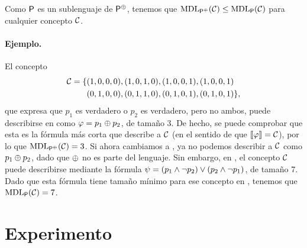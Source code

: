 Como ${\sf P}$ es un sublenguaje de ${\sf P}^\oplus$, tenemos que ${\rm MDL}_{{\sf P}^\oplus}(\mathcal{C})\leq{\rm MDL}_{{\sf P}}(\mathcal{C})$ para cualquier concepto $\mathcal{C}$.

\paragraph*{Ejemplo.}El concepto 
\begin{align*}
\mathcal{C}=\{&(1,0,0,0),(1,0,1,0),(1,0,0,1),(1,0,0,1)\\
&(0,1,0,0),(0,1,1,0),(0,1,0,1),(0,1,0,1)\},
\end{align*}
que expresa que $p_1$ es verdadero o $p_2$ es verdadero, pero no ambos, puede describirse en \gramboolxor como $\varphi=p_{1} \oplus p_{2}$, de tamaño 3. De hecho, se puede comprobar que esta es la fórmula más corta que describe a $\mathcal{C}$ (en el sentido de que $\llbracket \varphi\rrbracket=\mathcal{C}$), por lo que ${\rm MDL}_{{\sf P}^\oplus}(\mathcal{C})=3$. Si ahora cambiamos a \grambool, ya no podemos describir a $\mathcal{C}$ como $p_{1} \oplus p_{2}$, dado que $\oplus$ no es parte del lenguaje. Sin embargo, en \grambool, el concepto $\mathcal{C}$ puede describirse mediante la fórmula $\psi=(p_{1} \wedge \neg p_{2}) \vee (p_{2} \wedge \neg p_{1})$, de tamaño 7. Dado que esta fórmula tiene tamaño mínimo para ese concepto en \grambool, tenemos que ${\rm MDL}_{{\sf P}}(\mathcal{C})=7$.


\section{Experimento}


